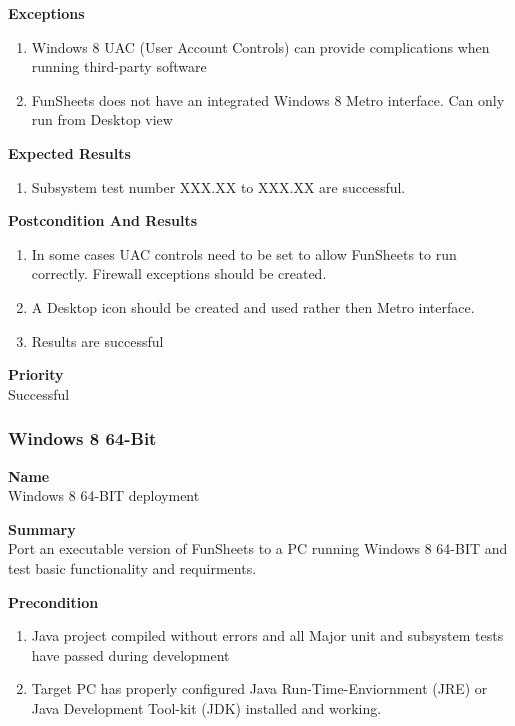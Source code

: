 \documentclass[12pt]{article}
\begin{document}
{\bf Exceptions}\
\begin{enumerate}
\item Windows 8 UAC (User Account Controls) can provide complications when running third-party software
\item FunSheets does not have an integrated Windows 8 Metro interface. Can only run from Desktop view
\end{enumerate}

{\bf Expected Results}\
\begin{enumerate}
\item Subsystem test number XXX.XX to XXX.XX are successful.
\end{enumerate}

{\bf Postcondition And Results}\
\begin{enumerate}
\item In some cases UAC controls need to be set to allow FunSheets to run correctly. Firewall exceptions should be created.
\item A Desktop icon should be created and used rather then Metro interface.
\item Results are successful
\end{enumerate}

\noindent
{\bf Priority}\\
Successful
\noindent

\clearpage
\subsubsection{Windows 8 64-Bit} \label{uc:1}

\noindent
{\bf Name}\\
Windows 8 64-BIT deployment

\noindent
{\bf Summary}\\
Port an executable version of FunSheets to a PC running Windows 8 64-BIT and test basic functionality and requirments.

\noindent
{\bf Precondition}\\
\begin{enumerate}
\item Java project compiled without errors and all Major unit and subsystem tests have passed during development
\item Target PC has properly configured Java Run-Time-Enviornment (JRE) or Java Development Tool-kit (JDK) installed and working.
\end{enumerate}
\end{document}
